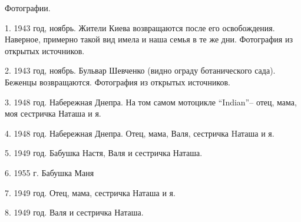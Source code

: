 Фотографии. 

1. 1943 год, ноябрь. Жители Киева возвращаются после его освобождения.
Наверное, примерно такой вид имела и наша семья в те же дни.  Фотография из
открытых источников. 

2. 1943 год, ноябрь. Бульвар Шевченко (видно ограду ботанического сада).
Беженцы возвращаются. Фотография из открытых источников. 

3. 1948 год. Набережная Днепра. На том самом мотоцикле \enquote{Indian}–
отец, мама, моя сестричка Наташа и я. 

4. 1948 год. Набережная Днепра. Отец, мама, Валя, сестричка Hаташа и я. 

5. 1949 год. Бабушка Настя, Валя и сестричка Наташа. 

6. 1955 г. Бабушка Маня 

7. 1949 год. Отец, мама, сестричка Наташа и я.

8. 1949 год. Валя и сестричка Наташа.

